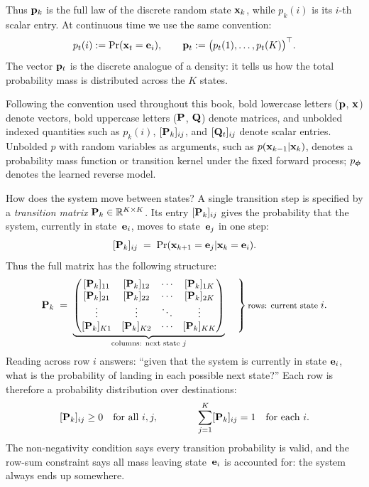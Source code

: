 Thus ${\mathbf{p}}_k$ is the full law of the discrete random state ${\mathbf{x}}_k$, while
$p_k(i)$ is its $i$-th scalar entry.  At continuous time we use the same
convention:
\[
p_t(i):=\Pr({\mathbf{x}}_t={\mathbf{e}}_i),
\qquad
{\mathbf{p}}_t:=\bigl(p_t(1),\ldots,p_t(K)\bigr)^\top.
\]
The vector ${\mathbf{p}}_t$ is the discrete analogue of a density: it tells us how
the total probability mass is distributed across the $K$ states.

Following the convention used throughout this book, bold lowercase letters
(${\mathbf{p}}$, ${\mathbf{x}}$) denote vectors, bold uppercase letters (${\mathbf{P}}$, ${\mathbf{Q}}$)
denote matrices, and unbolded indexed quantities such as $p_k(i)$,
$[{\mathbf{P}}_k]_{ij}$, and $[{\mathbf{Q}}_t]_{ij}$ denote scalar entries.  Unbolded
$p$ with random variables as arguments, such as
$p({\mathbf{x}}_{k-1}|{\mathbf{x}}_k)$, denotes a probability mass function or transition
kernel under the fixed forward process; $p_{{\bm{\phi}}}$ denotes the learned
reverse model.



How does the system move between states? A single transition step is
specified by a \emph{transition matrix} ${\mathbf{P}}_k \in \mathbb{R}^{K \times K}$.
Its entry $[{\mathbf{P}}_k]_{ij}$ gives the probability that the system,
currently in state~${\mathbf{e}}_i$, moves to state~${\mathbf{e}}_j$ in one step:
\[
[{\mathbf{P}}_k]_{ij} \;=\; \Pr({\mathbf{x}}_{k+1} = {\mathbf{e}}_j | {\mathbf{x}}_k = {\mathbf{e}}_i).
\]
Thus the full matrix has the following structure:
\[
\rmP_k \;=\;
\underbrace{
\begin{pmatrix}
[\rmP_k]_{11} & [\rmP_k]_{12} & \cdots & [\rmP_k]_{1K} \\
[\rmP_k]_{21} & [\rmP_k]_{22} & \cdots & [\rmP_k]_{2K} \\
\vdots & \vdots & \ddots & \vdots \\
[\rmP_k]_{K1} & [\rmP_k]_{K2} & \cdots & [\rmP_k]_{KK}
\end{pmatrix}
}_{\substack{\text{columns: next state } j}}
\quad
\left.
\vphantom{
\begin{pmatrix}
a \\ a \\ \vdots \\ a
\end{pmatrix}
}
\right\}
\text{\footnotesize rows: current state } i.
\]
Reading across row $i$ answers: ``given that the system is currently
in state ${\mathbf{e}}_i$, what is the probability of landing in each possible
next state?'' Each row is therefore a probability distribution over destinations:
\[
[{\mathbf{P}}_k]_{ij} \geq 0
\quad \text{for all } i,j,
\qquad\qquad
\sum_{j=1}^{K} [{\mathbf{P}}_k]_{ij} = 1
\quad \text{for each } i.
\]
The non-negativity condition says every transition probability is valid,
and the row-sum constraint says all mass leaving state~${\mathbf{e}}_i$ is accounted
for: the system always ends up somewhere.

